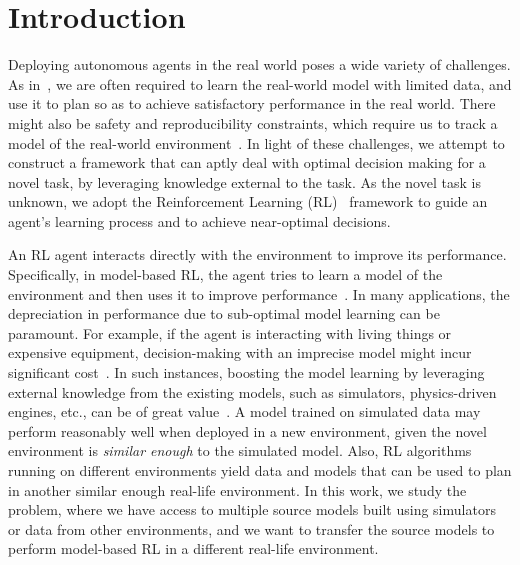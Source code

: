 \section{Introduction}\label{sec:intro}

Deploying autonomous agents in the real world poses a wide variety of challenges. As in~\citep{dulac2021challenges}, we are often required to learn the real-world model with limited data, and use it to plan so as to achieve satisfactory performance in the real world. There might also be safety and reproducibility constraints, which require us to track a model of the real-world environment~\citep{skirzynski2021automatic}.
In light of these challenges, we attempt to construct a framework that can aptly deal with optimal decision making for a novel task, by leveraging knowledge external to the task. As the novel task is unknown, we adopt the Reinforcement Learning (RL)~\citep{sutton2018reinforcement} framework to guide an agent's learning process and to achieve near-optimal decisions.

An RL agent interacts directly with the environment to improve its performance. Specifically, in model-based RL, the agent tries to learn a model of the environment and then uses it to improve performance~\citep{moerland2020model}. In many applications, the depreciation in performance due to sub-optimal model learning can be paramount. For example, if the agent is interacting with living things or expensive equipment, decision-making with an imprecise model might incur significant cost~\citep{polydoros2017survey}. In such instances, boosting the model learning by leveraging external knowledge from the existing models, such as simulators, physics-driven engines, etc., can be of great value~\citep{taylor2008transferring}. A model trained on simulated data may perform reasonably well when deployed in a new environment, given the novel environment is \emph{similar enough} to the simulated model. 
Also, RL algorithms running on different environments yield data and models that can be used to plan in another similar enough real-life environment.
In this work, we study the problem, where we have access to multiple source models built using simulators or data from other environments, and we want to transfer the source models to perform model-based RL in a different real-life environment.


